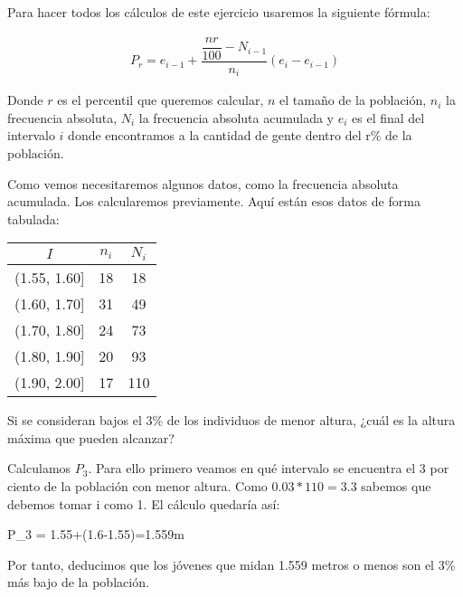 Para hacer todos los cálculos de este ejercicio usaremos la siguiente fórmula:

\begin{gather}\tag{Percentil}
    P_{r} = e_{i-1}+\dfrac{\dfrac{nr}{100}-N_{i-1}}{n_{i}}(e_{i}-e_{i-1})
\end{gather}

Donde $r$ es el percentil que queremos calcular, $n$ el tamaño de la población, $n_{i}$ la frecuencia absoluta, $N_{i}$ la frecuencia absoluta acumulada y $e_{i}$ es el final del intervalo $i$ donde encontramos a la cantidad de gente dentro del r\% de la población.

Como vemos necesitaremos algunos datos, como la frecuencia absoluta acumulada. Los calcularemos previamente. Aquí están esos datos de forma tabulada:

\begin{center}
	\begin{table}[htbp]
		\begin{center}
			\begin{tabular}{|c|c|c|}
				\hline
				$I$ & $n_{i}$ & $N_{i}$\\\hline
				(1.55, 1.60] & 18 & 18 \\ \hline
				(1.60, 1.70] & 31 & 49 \\ \hline
				(1.70, 1.80] & 24 & 73 \\ \hline
				(1.80, 1.90] & 20 & 93 \\ \hline
				(1.90, 2.00] & 17 & 110 \\ \hline
			\end{tabular}
		\end{center}
	\end{table}
\end{center}

\subproblem
Si se consideran bajos el 3\% de los individuos de menor altura, ¿cuál es la altura máxima que pueden alcanzar?

Calculamos $P_{3}$. Para ello primero veamos en qué intervalo se encuentra el 3 por ciento de la población con menor altura. Como $0.03*110=3.3$ sabemos que debemos tomar i como 1. El cálculo quedaría así:
\\
\begin{center}
    \begin{*gather}
        P_{3} = 1.55+(1.6-1.55)=1.559m
    \end{*gather}
\end{center}

Por tanto, deducimos que los jóvenes que midan 1.559 metros o menos son el $3\%$ más bajo de la población.

